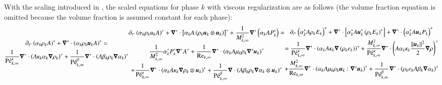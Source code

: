 \documentclass[preprint,10pt]{elsarticle}
\begin{document}
%
With the scaling introduced in , the scaled equations for phase $k$ with viscous regularization are as follows 
(the volume fraction equation is omitted because the volume fraction is assumed constant for each phase): %
% 
\begin{subequations}\label{eq:sev_equ_case_one_scaled}
%
\begin{multline}\label{eq:sev_equ-with-diss-terms-cont_case_one_scaled}
\partial_{t^*} \left( \alpha_k \rho_k A \right)^* + \grad^* \cdot \left( \alpha_k \rho_k \mbold u_k A \right)^* = \\ \frac{1}{\Pe^\kappa_{k,\infty}}\grad^* \cdot \left(A \kappa_k \alpha_k \grad \rho_k \right)^* +
\frac{1}{\Pe_{k,\infty}^\beta} \grad^* \cdot \left( A \beta_k \rho_k \grad \alpha_k \right)^*
\end{multline}
%
\begin{multline}\label{eq:sev_equ-with-diss-terms-mom_case_one_scaled}
\partial_{t^*} \left( \alpha_k \rho_k u_k A \right)^* + \grad^* \cdot \left[ \alpha_k A \left( \rho_k \mbold u_k \otimes \mbold u_k\right)\right]^* + \frac{1}{M^2_{k,\infty}}\grad^* \left( \alpha_k A P_k^* \right) = \\
  \frac{1}{M^2_{k,\infty}} \alpha_k^* P^*_k \grad^* A^*  
+ \frac{1}{\Re_{k,\infty}}\grad^* \cdot \left( \alpha_k A \mu_k \rho_k \grad^s \mbold u_k \right)^* \\ 
+ \frac{1}{\Pe_{k,\infty}^\kappa} \grad^* \cdot\left( \alpha_k A \kappa_k \grad \rho_k \otimes \mbold u_k \right)^* 
+ \frac{1}{\Pe_{k,\infty}^\beta} \grad \cdot \left( A \beta_k \rho_k \grad \alpha_k \otimes \mbold u_k \right)^*
\end{multline}
%
\begin{multline}\label{eq:sev_equ-with-diss-terms-ener_case_one_scaled}
\partial_{t^*} \left( \alpha_k^* A \rho_k E_k \right)^* + \grad^* \cdot \left[ \alpha_k^* A \mbold u_k^*  \left( \rho_k E_k \right)^* \right] +  \grad^* \cdot \left(\alpha_k^* A \mbold u_k P_k \right)^*  \\ =
\frac{1}{\Pe_{k,\infty}^\kappa} \grad^* \cdot \left( \alpha_k A \kappa_k \grad \left( \rho_k e_k \right) \right)^* 
+ \frac{M^2_{k,\infty}}{\Pe_{k,\infty}^\kappa} \grad^* \cdot \left( A\alpha_k \kappa_k \frac{||\mbold u_k||^2}{2} \grad \rho \right)^*  \\
+ \frac{M^2_{k,\infty}}{\Re_{k,\infty}} \grad^* \cdot \left( \alpha_k A \mu_k \rho_k \mbold u_k : \grad^s \mbold u_k\right)^* 
+ \frac{1}{\Pe_{k,\infty}^\beta } \grad^*\cdot \left( \rho_k e_k A \beta_k \grad \alpha_k \right)^*
\end{multline}
%
\end{subequations}
\end{document}

